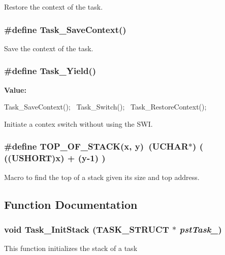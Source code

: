Restore the context of the task. 
\subsubsection[{Task\_\-SaveContext}]{\setlength{\rightskip}{0pt plus 5cm}\#define Task\_\-SaveContext()}\label{taskport_8h_a363b78076c8d648633e759a63431629d}


Save the context of the task. 
\subsubsection[{Task\_\-Yield}]{\setlength{\rightskip}{0pt plus 5cm}\#define Task\_\-Yield()}\label{taskport_8h_add53f3a50b865bc057ce2c84f73d0f33}
{\bfseries Value:}
\begin{DoxyCode}
Task_SaveContext(); \
Task_Switch(); \
Task_RestoreContext();
\end{DoxyCode}


Initiate a contex switch without using the SWI. 
\subsubsection[{TOP\_\-OF\_\-STACK}]{\setlength{\rightskip}{0pt plus 5cm}\#define TOP\_\-OF\_\-STACK(x, \/  y)~(UCHAR$\ast$) ( ((USHORT)x) + (y-\/1) )}\label{taskport_8h_a42b1de7cdc8215544135fe81d59a0bb6}


Macro to find the top of a stack given its size and top address. 

\subsection{Function Documentation}
\subsubsection[{Task\_\-InitStack}]{\setlength{\rightskip}{0pt plus 5cm}void Task\_\-InitStack ({\bf TASK\_\-STRUCT} $\ast$ {\em pstTask\_\-})}\label{taskport_8h_a1b30a9b6f0c4428cc8f64c34c7fe7d65}
This function initializes the stack of a task


